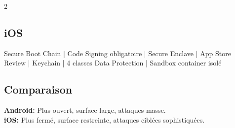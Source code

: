 \documentclass[9pt,a4paper]{extarticle}
\begin{document}
\begin{multicols}{2}
\subsection*{iOS}
Secure Boot Chain | Code Signing obligatoire | Secure Enclave | App Store Review | Keychain | 4 classes Data Protection | Sandbox container isolé

\subsection*{Comparaison}
\textbf{Android:} Plus ouvert, surface large, attaques masse.\\
\textbf{iOS:} Plus fermé, surface restreinte, attaques ciblées sophistiquées.

\end{multicols}
\end{document}
